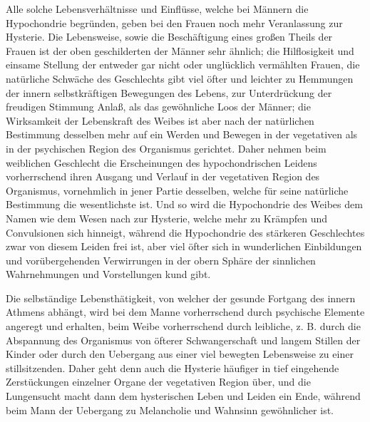 Alle solche Lebensverhältnisse und Einflüsse, welche bei Männern die Hypochondrie begründen, geben bei den Frauen noch mehr Veranlassung zur Hysterie. Die Lebensweise, sowie die Beschäftigung eines großen Theils der Frauen ist der oben geschilderten der Männer sehr ähnlich; die Hilflosigkeit
und einsame Stellung der entweder gar nicht oder unglücklich vermählten Frauen, die natürliche Schwäche des Geschlechts gibt viel öfter und leichter zu Hemmungen der innern selbstkräftigen Bewegungen des Lebens, zur Unterdrückung der freudigen Stimmung Anlaß, als das gewöhnliche Loos der Männer; die Wirksamkeit der Lebenskraft des Weibes ist aber nach der natürlichen Bestimmung desselben mehr auf ein Werden und Bewegen in der vegetativen als in der psychischen Region des Organismus gerichtet. Daher nehmen beim weiblichen Geschlecht die Erscheinungen des hypochondrischen Leidens vorherrschend ihren Ausgang und Verlauf in der vegetativen Region des Organismus, vornehmlich in jener Partie desselben, welche für seine natürliche Bestimmung die wesentlichste ist. Und so wird die Hypochondrie des Weibes dem Namen wie dem Wesen nach zur Hysterie, welche mehr zu Krämpfen und Convulsionen sich hinneigt, während die Hypochondrie des stärkeren Geschlechtes zwar von diesem Leiden frei ist, aber viel öfter sich in wunderlichen Einbildungen und vorübergehenden Verwirrungen in der obern Sphäre der sinnlichen Wahrnehmungen und Vorstellungen kund gibt.

Die selbständige Lebensthätigkeit, von welcher der gesunde Fortgang des innern Athmens abhängt, wird bei dem Manne vorherrschend durch psychische Elemente angeregt und erhalten, beim Weibe vorherrschend durch leibliche, z. B. durch die Abspannung des Organismus von öfterer Schwangerschaft und langem Stillen der Kinder oder durch den Uebergang aus einer viel bewegten Lebensweise zu einer stillsitzenden. Daher geht denn auch die Hysterie häufiger in tief
eingehende Zerstückungen einzelner Organe der vegetativen Region über, und die Lungensucht macht dann dem hysterischen Leben und Leiden ein Ende, während beim Mann der Uebergang zu Melancholie und Wahnsinn gewöhnlicher ist.

